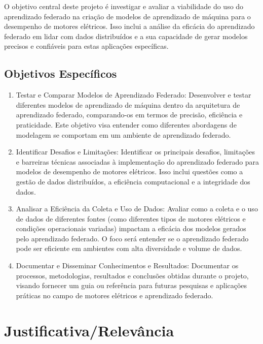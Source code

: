 \documentclass{article}
\begin{document}
O objetivo central deste projeto é investigar e avaliar a viabilidade do uso do aprendizado federado na criação de modelos de aprendizado de máquina para o desempenho de motores elétricos. Isso inclui a análise da eficácia do aprendizado federado em lidar com dados distribuídos e a sua capacidade de gerar modelos precisos e confiáveis para estas aplicações específicas.

\subsection{Objetivos Específicos}

\begin{enumerate}
    \item  Testar e Comparar Modelos de Aprendizado Federado: Desenvolver e testar diferentes modelos de aprendizado de máquina dentro da arquitetura de aprendizado federado, comparando-os em termos de precisão, eficiência e praticidade. Este objetivo visa entender como diferentes abordagens de modelagem se comportam em um ambiente de aprendizado federado.
    
    \item Identificar Desafios e Limitações: Identificar os principais desafios, limitações e barreiras técnicas associadas à implementação do aprendizado federado para modelos de desempenho de motores elétricos. Isso inclui questões como a gestão de dados distribuídos, a eficiência computacional e a integridade dos dados.
    
    \item Analisar a Eficiência da Coleta e Uso de Dados: Avaliar como a coleta e o uso de dados de diferentes fontes (como diferentes tipos de motores elétricos e condições operacionais variadas) impactam a eficácia dos modelos gerados pelo aprendizado federado. O foco será entender se o aprendizado federado pode ser eficiente em ambientes com alta diversidade e volume de dados.
    
    \item Documentar e Disseminar Conhecimentos e Resultados: Documentar os processos, metodologias, resultados e conclusões obtidas durante o projeto, visando fornecer um guia ou referência para futuras pesquisas e aplicações práticas no campo de motores elétricos e aprendizado federado.

\end{enumerate}
   
\section{Justificativa/Relevância}
\end{document}
